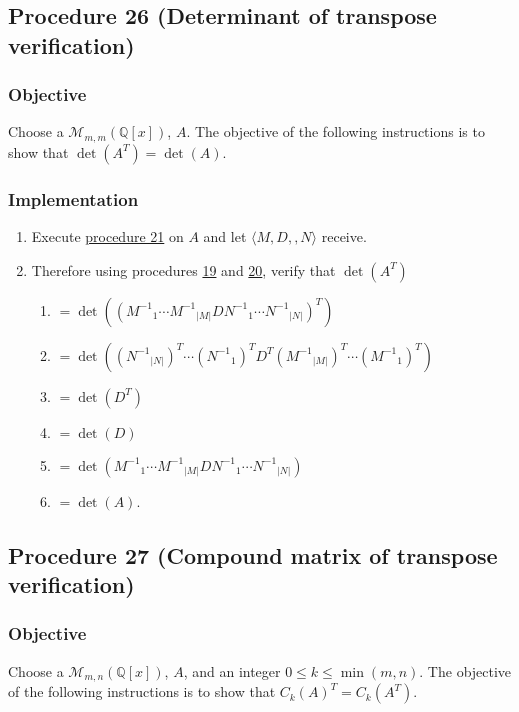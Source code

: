 \documentclass[twocolumn]{article}
\begin{document}
		\subsection{Procedure 26 (Determinant of transpose verification)}\label{sec:procedure 26}
			\subsubsection{Objective}
				Choose a $\mathcal{M}_{m,m}(\mathbb{Q}[x])$, $A$. The objective of the following instructions is to show that $\det(A^T)=\det(A)$.
			\subsubsection{Implementation}
				\begin{enumerate}
					\item Execute \hyperref[sec:procedure 21]{procedure 21} on $A$ and let $\langle M,D,,N\rangle$ receive.
					\item Therefore using procedures \hyperref[sec:procedure 23]{19} and \hyperref[sec:procedure 24]{20}, verify that $\det(A^T)$
					\begin{enumerate}
						\item $=\det(({M^{-1}}_1\cdots {M^{-1}}_{\lvert M\rvert}D{N^{-1}}_1\cdots {N^{-1}}_{\lvert N\rvert})^T)$
						\item $=\det(({N^{-1}}_{\lvert N\rvert})^T\cdots({N^{-1}}_1)^TD^T({M^{-1}}_{\lvert M\rvert})^T\cdots({M^{-1}}_1)^T)$
						\item $=\det(D^T)$
						\item $=\det(D)$
						\item $=\det({M^{-1}}_1\cdots {M^{-1}}_{\lvert M\rvert}D{N^{-1}}_1\cdots {N^{-1}}_{\lvert N\rvert})$
						\item $=\det(A)$.
					\end{enumerate}
				\end{enumerate}
		\subsection{Procedure 27 (Compound matrix of transpose verification)}\label{sec:procedure 27}
			\subsubsection{Objective}
				Choose a $\mathcal{M}_{m,n}(\mathbb{Q}[x])$, $A$, and an integer $0\le k\le\min(m,n)$. The objective of the following instructions is to show that $C_k(A)^T=C_k(A^T)$.
\end{document}
